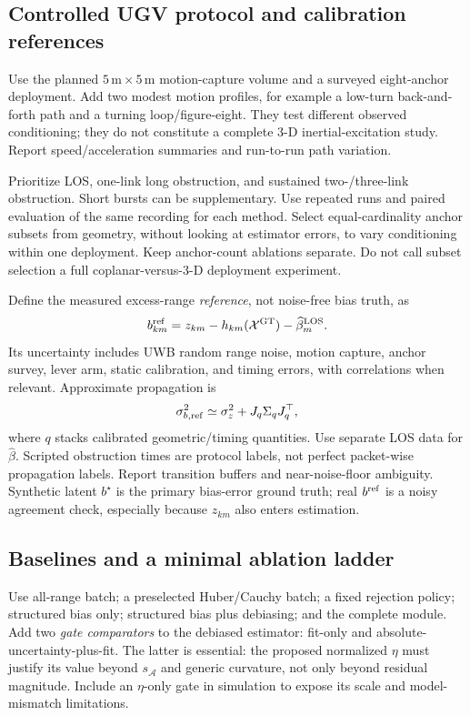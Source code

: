 \documentclass[conference]{IEEEtran}
\newcommand{\X}{\mathcal X}
\newcommand{\A}{\mathcal A}
\begin{document}
\subsection{Controlled UGV protocol and calibration references}
Use the planned $5\,\mathrm m\times5\,\mathrm m$ motion-capture volume and a surveyed eight-anchor deployment. Add two modest motion profiles, for example a low-turn back-and-forth path and a turning loop/figure-eight. They test different observed conditioning; they do not constitute a complete 3-D inertial-excitation study. Report speed/acceleration summaries and run-to-run path variation.

Prioritize LOS, one-link long obstruction, and sustained two-/three-link obstruction. Short bursts can be supplementary. Use repeated runs and paired evaluation of the same recording for each method. Select equal-cardinality anchor subsets from geometry, without looking at estimator errors, to vary conditioning within one deployment. Keep anchor-count ablations separate. Do not call subset selection a full coplanar-versus-3-D deployment experiment.

Define the measured excess-range \emph{reference}, not noise-free bias truth, as
\begin{equation}
 b^{\rm ref}_{km}=z_{km}-h_{km}(\X^{\rm GT})-
                         \widehat\beta_m^{\rm LOS}.
 \label{eq:reference_bias}
\end{equation}
Its uncertainty includes UWB random range noise, motion capture, anchor survey, lever arm, static calibration, and timing errors, with correlations when relevant. Approximate propagation is
\begin{equation}
 \sigma_{b,\rm ref}^2\simeq\sigma_z^2+J_q\Sigma_qJ_q^\top,
 \label{eq:reference_budget}
\end{equation}
where $q$ stacks calibrated geometric/timing quantities. Use separate LOS data for $\widehat\beta$. Scripted obstruction times are protocol labels, not perfect packet-wise propagation labels. Report transition buffers and near-noise-floor ambiguity. Synthetic latent $b^\star$ is the primary bias-error ground truth; real $b^{\rm ref}$ is a noisy agreement check, especially because $z_{km}$ also enters estimation.

\subsection{Baselines and a minimal ablation ladder}
Use all-range batch; a preselected Huber/Cauchy batch; a fixed rejection policy; structured bias only; structured bias plus debiasing; and the complete module. Add two \emph{gate comparators} to the debiased estimator: fit-only and absolute-uncertainty-plus-fit. The latter is essential: the proposed normalized $\eta$ must justify its value beyond $s_\A$ and generic curvature, not only beyond residual magnitude. Include an $\eta$-only gate in simulation to expose its scale and model-mismatch limitations.
\end{document}
